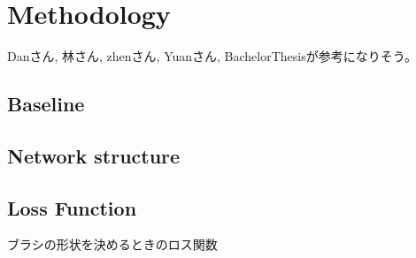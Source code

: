 \chapter{Methodology}
Danさん, 林さん, zhenさん, Yuanさん, BachelorThesisが参考になりそう。

\section{Baseline}
\section{Network structure}

\section{Loss Function}

ブラシの形状を決めるときのロス関数